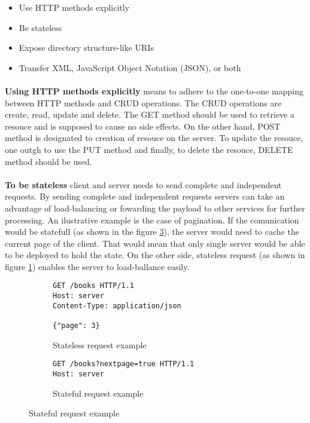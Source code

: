 \begin{itemize}
  \item Use HTTP methods explicitly
  \item Be stateless
  \item Expose directory structure-like URIs
  \item Transfer XML, JavaScript Object Notation (JSON), or both
\end{itemize}

\paragraph{}
\textbf{Using HTTP methods explicitly} means to adhere to the one-to-one mapping between HTTP methods and CRUD operations. The CRUD operations are create, read, update and delete. The GET method should be used to retrieve a resouce and is supposed to cause no side effects. On the other hand, POST method is designated to creation of resouce on the server. To update the resouce, one outgh to use the PUT method and finally, to delete the resouce, DELETE method should be used.

\paragraph{}
\textbf{To be stateless} client and server needs to send complete and independent requests. By sending complete and independent requests servers can take an advantage of load-balancing or fowarding the payload to other services for further processing. An ilustrative example is the case of pagination. If the comunication would be statefull (as shown in the figure \ref{fig:Stateful request example}), the server would need to cache the current page of the client. That would mean that only single server would be able to be deployed to hold the state. On the other side, stateless request (as shown in figure \ref{fig:Stateless request example}) enables the server to load-ballance easily.

\begin{figure}
  \begin{subfigure}{}
    \begin{minipage}{0.5\textwidth}
      \begin{verbatim}
GET /books HTTP/1.1
Host: server
Content-Type: application/json

{"page": 3}
      \end{verbatim}
      \caption{Stateless request example}
      \label{fig:Stateless request example}
    \end{minipage}
  \end{subfigure}
  \begin{subfigure}{}
    \begin{minipage}{0.5\textwidth}
      \begin{verbatim}
GET /books?nextpage=true HTTP/1.1
Host: server
      \end{verbatim}
      \caption{Stateful request example}
      \label{fig:Stateful request example}
    \end{minipage}
  \end{subfigure}
\end{figure}

